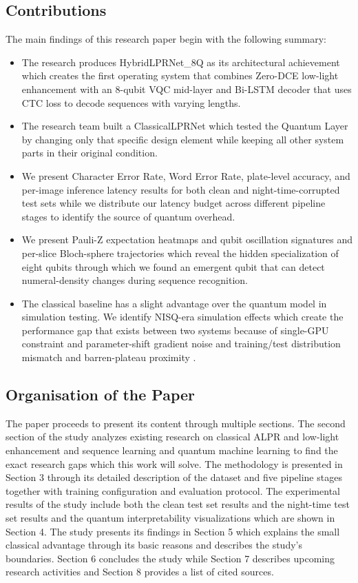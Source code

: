 \documentclass{ieeeaccess}
\begin{document}
\subsection{Contributions}
The main findings of this research paper begin with the following summary:
\begin{itemize}
\item The research produces HybridLPRNet\_8Q as its architectural achievement which creates the first operating system that combines Zero-DCE low-light enhancement with an 8-qubit VQC mid-layer and Bi-LSTM decoder that uses CTC loss to decode sequences with varying lengths.
\item The research team built a ClassicalLPRNet which tested the Quantum Layer by changing only that specific design element while keeping all other system parts in their original condition.
\item We present Character Error Rate, Word Error Rate, plate-level accuracy, and per-image inference latency results for both clean and night-time-corrupted test sets while we distribute our latency budget across different pipeline stages to identify the source of quantum overhead.
\item We present Pauli-Z expectation heatmaps and qubit oscillation signatures and per-slice Bloch-sphere trajectories which reveal the hidden specialization of eight qubits through which we found an emergent qubit that can detect numeral-density changes during sequence recognition.
\item The classical baseline has a slight advantage over the quantum model in simulation testing. We identify NISQ-era simulation effects which create the performance gap that exists between two systems because of single-GPU constraint and parameter-shift gradient noise and training/test distribution mismatch and barren-plateau proximity \cite{b4}.
\end{itemize}

\subsection{Organisation of the Paper}
The paper proceeds to present its content through multiple sections. The second section of the study analyzes existing research on classical ALPR and low-light enhancement and sequence learning and quantum machine learning to find the exact research gaps which this work will solve. The methodology is presented in Section 3 through its detailed description of the dataset and five pipeline stages together with training configuration and evaluation protocol. The experimental results of the study include both the clean test set results and the night-time test set results and the quantum interpretability visualizations which are shown in Section 4. The study presents its findings in Section 5 which explains the small classical advantage through its basic reasons and describes the study's boundaries. Section 6 concludes the study while Section 7 describes upcoming research activities and Section 8 provides a list of cited sources.
\end{document}
